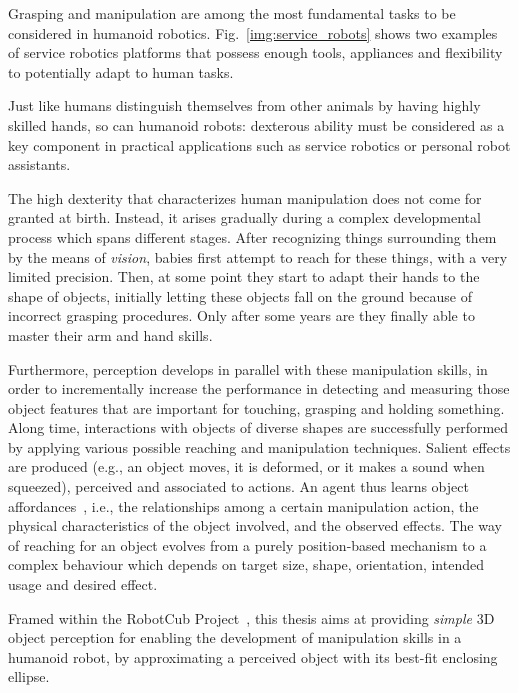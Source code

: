 Grasping and manipulation are among the most fundamental tasks to be considered in humanoid robotics. Fig.~\ref{img:service_robots} shows two examples of service robotics platforms that possess enough tools, appliances and flexibility to potentially adapt to human tasks.

Just like humans distinguish themselves from other animals by having highly skilled hands, so can humanoid robots: dexterous ability must be considered as a key component in practical applications such as service robotics or personal robot assistants.

The high dexterity that characterizes human manipulation does not come for granted at birth. Instead, it arises gradually during a complex developmental process which spans different stages. After recognizing things surrounding them by the means of \emph{vision}, babies first attempt to reach for these things, with a very limited precision. Then, at some point they start to adapt their hands to the shape of objects, initially letting these objects fall on the ground because of incorrect grasping procedures. Only after some years are they finally able to master their arm and hand skills.

Furthermore, perception develops in parallel with these manipulation skills, in order to incrementally increase the performance in detecting and measuring those object features that are important for touching, grasping and holding something. Along time, interactions with objects of diverse shapes are successfully performed by applying various possible reaching and manipulation techniques. Salient effects are produced (e.g., an object moves, it is deformed, or it makes a sound when squeezed), perceived and associated to actions. An agent thus learns object affordances~\cite{montesano:2008}, i.e., the relationships among a certain manipulation action, the physical characteristics of the object involved, and the observed effects. The way of reaching for an object evolves from a purely position-based mechanism to a complex behaviour which depends on target size, shape, orientation, intended usage and desired effect.

Framed within the \ac{RobotCub} Project~\cite{metta:2005}, this thesis aims at providing \emph{simple} 3D object perception for enabling the development of manipulation skills in a humanoid robot, by approximating a perceived object with its best-fit enclosing ellipse. 

